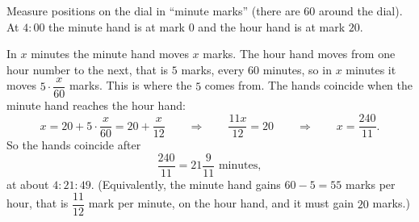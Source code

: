 Measure positions on the dial in ``minute marks'' (there are $60$ around the dial). At $4{:}00$ the minute hand is at mark $0$ and the hour hand is at mark $20$.

In $x$ minutes the minute hand moves $x$ marks. The hour hand moves from one hour number to the next, that is $5$ marks, every $60$ minutes, so in $x$ minutes it moves $5\cdot\dfrac{x}{60}$ marks. This is where the $5$ comes from. The hands coincide when the minute hand reaches the hour hand:
\[
x=20+5\cdot\dfrac{x}{60}=20+\dfrac{x}{12}\qquad\Longrightarrow\qquad \dfrac{11x}{12}=20\qquad\Longrightarrow\qquad x=\dfrac{240}{11}.
\]
So the hands coincide after
\[
\boxed{\dfrac{240}{11}=21\dfrac{9}{11}\text{ minutes}},
\]
at about $4{:}21{:}49$. (Equivalently, the minute hand gains $60-5=55$ marks per hour, that is $\dfrac{11}{12}$ mark per minute, on the hour hand, and it must gain $20$ marks.)
